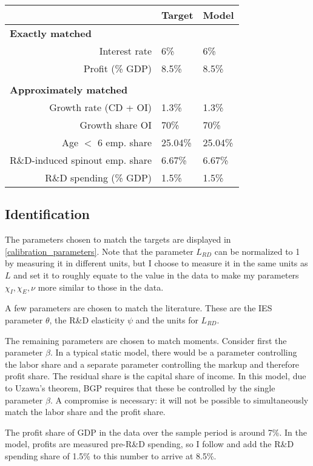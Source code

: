 \documentclass[12pt,english]{article}
\theoremstyle{remark}
\begin{document}
\begin{table}[]
	\centering
	\label{calibration_targets}
	\begin{tabular}{rll}
		\toprule \toprule
		& Target & Model \tabularnewline
		\midrule
		\multicolumn{1}{l}{\textbf{Exactly matched}} & &  \tabularnewline
		Interest rate & 6\% & 6\% \tabularnewline
		Profit (\% GDP) & 8.5\% & 8.5\% \tabularnewline
		\tabularnewline
		\multicolumn{1}{l}{\textbf{Approximately matched}} & & 
		\tabularnewline
		Growth rate (CD + OI) & 1.3\% & 1.3\%
		\tabularnewline		
		Growth share OI & 70\% & 70\%
		\tabularnewline
		Age $<$ 6 emp. share  & 25.04\% & 25.04\%
		\tabularnewline
		R\&D-induced spinout emp. share & 6.67\% & 6.67\%
		\tabularnewline
		R\&D spending (\% GDP) & 1.5\% & 1.5\%
		\tabularnewline
		\bottomrule
	\end{tabular}
\end{table}

\normalsize

\subsection{Identification}

The parameters chosen to match the targets are displayed in \autoref{calibration_parameters}. Note that the parameter $L_{RD}$ can be normalized to 1 by measuring it in different units, but I choose to measure it in the same units as $L$ and set it to roughly equate to the value in the data to make my parameters $\chi_I,\chi_E,\nu$ more similar to those in the data. 

A few parameters are chosen to match the literature. These are the IES parameter $\theta$, the R\&D elasticity $\psi$ and the units for $L_{RD}$. 

The remaining parameters are chosen to match moments. Consider first the parameter $\beta$. In a typical static model, there would be a parameter controlling the labor share and a separate parameter controlling the markup and therefore profit share. The residual share is the capital share of income. In this model, due to Uzawa's theorem, BGP requires that these be controlled by the single parameter $\beta$. A compromise is necessary: it will not be possible to simultaneously match the labor share and the profit share. 

The profit share of GDP in the data over the sample period is around 7\%. In the model, profits are measured pre-R\&D spending, so I follow \cite{akcigit_growth_2018} and add the R\&D spending share of 1.5\% to this number to arrive at 8.5\%. 
\end{document}

